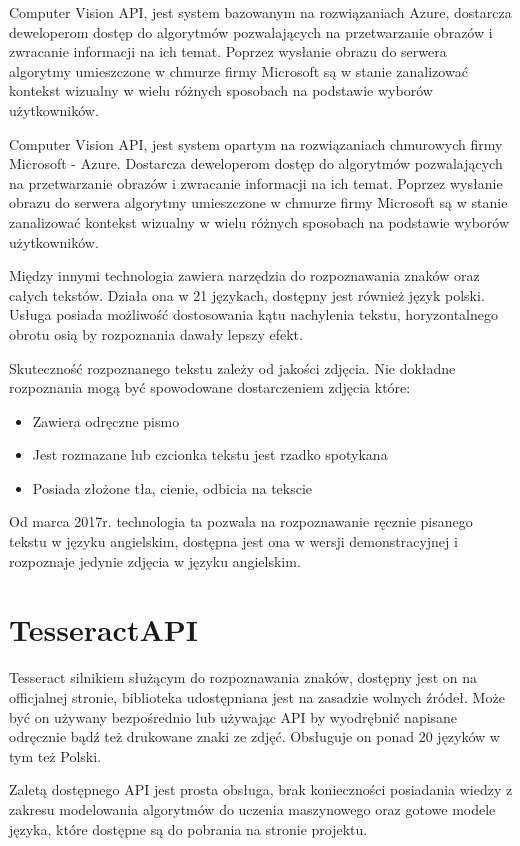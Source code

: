 \documentclass[brudnopis]{xmgr}
\begin{document}
Computer Vision API, jest system bazowanym na rozwiązaniach Azure, dostarcza deweloperom dostęp do algorytmów pozwalających na przetwarzanie obrazów i zwracanie informacji na ich temat. Poprzez wysłanie obrazu do serwera algorytmy umieszczone w chmurze firmy Microsoft są w stanie zanalizować kontekst wizualny w wielu różnych sposobach na podstawie wyborów użytkowników.

Computer Vision API, jest system opartym na rozwiązaniach chmurowych firmy Microsoft - Azure. Dostarcza deweloperom dostęp do algorytmów pozwalających na przetwarzanie obrazów i zwracanie informacji na ich temat. Poprzez wysłanie obrazu do serwera algorytmy umieszczone w chmurze firmy Microsoft są w stanie zanalizować kontekst wizualny w wielu różnych sposobach na podstawie wyborów użytkowników.

Między innymi technologia zawiera narzędzia do rozpoznawania znaków oraz całych tekstów. Działa ona w 21 językach, dostępny jest również język polski. Usługa posiada możliwość dostosowania kątu nachylenia tekstu, horyzontalnego obrotu osią by rozpoznania dawały lepszy efekt. 

Skuteczność rozpoznanego tekstu zależy od jakości zdjęcia. Nie dokładne rozpoznania mogą być spowodowane dostarczeniem zdjęcia które:

\begin{itemize}
\item
Zawiera odręczne pismo
\item
Jest rozmazane lub czcionka tekstu jest rzadko spotykana
\item
Posiada złożone tła, cienie, odbicia na tekscie
\end{itemize}

Od marca 2017r. technologia ta pozwala na rozpoznawanie ręcznie pisanego tekstu w języku angielskim, dostępna jest ona w wersji demonstracyjnej i rozpoznaje jedynie zdjęcia w języku angielskim.

\section{TesseractAPI}

Tesseract silnikiem służącym do rozpoznawania znaków, dostępny jest on na officjalnej stronie\cite{10}, biblioteka udostępniana jest na zasadzie wolnych źródeł. Może być on używany bezpośrednio lub używając API by wyodrębnić napisane odręcznie bądź też drukowane znaki ze zdjęć. Obsługuje on ponad 20 języków w tym też Polski.

Zaletą dostępnego API jest prosta obsługa, brak konieczności posiadania wiedzy z zakresu modelowania algorytmów do uczenia maszynowego oraz gotowe modele języka, które dostępne są do pobrania na stronie projektu.
\end{document}
